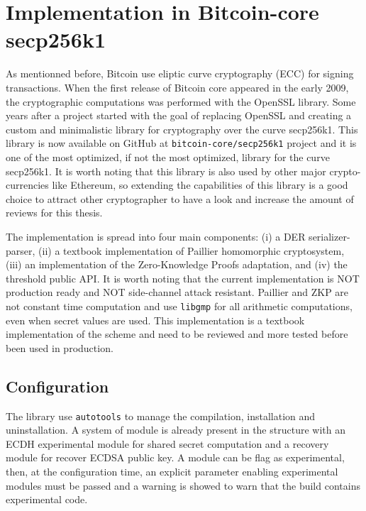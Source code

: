 \chapter{Implementation in Bitcoin-core secp256k1}
\label{chap:implementation-secp256k1}

As mentionned before, Bitcoin use eliptic curve cryptography (ECC) for signing transactions.
When the first release of Bitcoin core appeared in the early 2009, the cryptographic
computations was performed with the OpenSSL library. Some years after a project
started with the goal of replacing OpenSSL and creating a custom and minimalistic
library for cryptography over the curve secp256k1. This library is now available
on GitHub at \texttt{bitcoin-core/secp256k1} project and it is one of the most optimized,
if not the most optimized, library for the curve secp256k1. It is worth noting that
this library is also used by other major crypto-currencies like Ethereum, so extending
the capabilities of this library is a good choice to attract other cryptographer
to have a look and increase the amount of reviews for this thesis.

The implementation is spread into four main components: (i) a DER serializer-parser,
(ii) a textbook implementation of Paillier homomorphic cryptosystem, (iii) an
implementation of the Zero-Knowledge Proofs adaptation, and (iv) the threshold
public API. It is worth noting that the current implementation is NOT production
ready and NOT side-channel attack resistant. Paillier and ZKP are not constant
time computation and use \texttt{libgmp} for all arithmetic computations, even
when secret values are used. This implementation is a textbook implementation
of the scheme and need to be reviewed and more tested before been used in production.

\minitoc

\newpage

\section{Configuration}

The library use \texttt{autotools} to manage the compilation, installation and
uninstallation. A system of module is already present in the structure with an
ECDH experimental module for shared secret computation and a recovery module for
recover ECDSA public key. A module can be flag as experimental, then, at the
configuration time, an explicit parameter enabling experimental modules must be
passed and a warning is showed to warn that the build contains experimental code.

